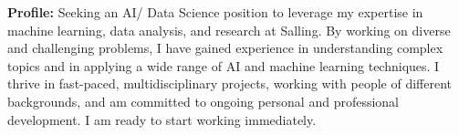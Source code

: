 \documentclass[a4paper,12pt]{article}
\begin{document}
\begin{center}
    \colorbox[HTML]{\primaryHTMLColorToUse}
     {\begin{minipage}[c]{16cm}
      \textbf{\textcolor{\primaryColorToUse}{Profile:}} {\textcolor{\objTextColorToUse}{Seeking an AI/ Data Science position to leverage my expertise in machine learning, data analysis, and research at Salling. By working on diverse and challenging problems, I have gained experience in understanding complex topics and in applying a wide range of AI and machine learning techniques. I thrive in fast-paced, multidisciplinary projects, working with people of different backgrounds, and am committed to ongoing personal and professional development. I am ready to start working immediately.
}}
     \end{minipage}}
\end{center}
\end{document}
